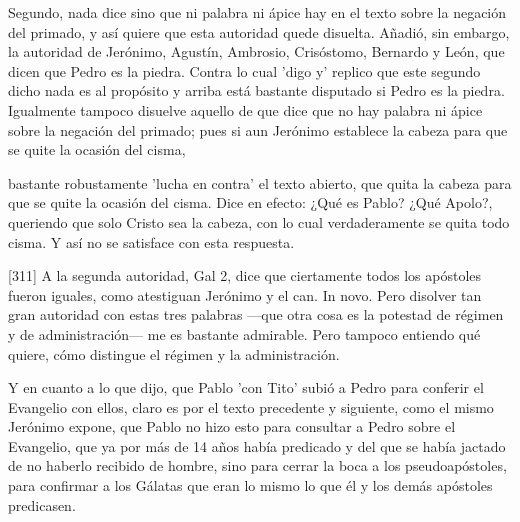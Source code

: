 Segundo, nada dice sino que ni palabra ni ápice hay en el texto sobre la negación del primado, y así quiere que esta autoridad quede disuelta. Añadió, sin embargo, la autoridad de Jerónimo, Agustín, Ambrosio, Crisóstomo, Bernardo y León, que dicen que Pedro es la piedra. Contra lo cual 'digo y' replico que este segundo dicho nada es al propósito y arriba está bastante disputado si Pedro es la piedra. Igualmente tampoco disuelve aquello de que dice que no hay palabra ni ápice sobre la negación del primado; pues si aun Jerónimo establece la cabeza para que se quite la ocasión del cisma,

bastante robustamente 'lucha en contra' el texto abierto, que quita la cabeza para que se quite la ocasión del cisma. Dice en efecto: ¿Qué es Pablo? ¿Qué Apolo?, queriendo que solo Cristo sea la cabeza, con lo cual verdaderamente se quita todo cisma. Y así no se satisface con esta respuesta.

[311] A la segunda autoridad, Gal 2, dice que ciertamente todos los apóstoles fueron iguales, como atestiguan Jerónimo y el can. In novo. Pero disolver tan gran autoridad con estas tres palabras —que otra cosa es la potestad de régimen y de administración— me es bastante admirable. Pero tampoco entiendo qué quiere, cómo distingue el régimen y la administración.

Y en cuanto a lo que dijo, que Pablo 'con Tito' subió a Pedro para conferir el Evangelio con ellos, claro es por el texto precedente y siguiente, como el mismo Jerónimo expone, que Pablo no hizo esto para consultar a Pedro sobre el Evangelio, que ya por más de 14 años había predicado y del que se había jactado de no haberlo recibido de hombre, sino para cerrar la boca a los pseudoapóstoles, para confirmar a los Gálatas que eran lo mismo lo que él y los demás apóstoles predicasen.

